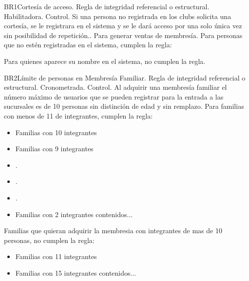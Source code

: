 \begin{BussinesRule}{BR1}{Cortesía de acceso.}
	\BRitem[Tipo:] Regla de integridad referencial o estructural. 
	\BRitem[Clase:] Habilitadora. 
	\BRitem[Nivel:] Control. %
	\BRitem[Descripción:]	Si una persona no registrada en los clubs solicita una cortesía, se le registrara en el sistema y se le dará acceso por una solo única vez sin posibilidad de repetición..
	\BRitem[Motivación:] Para generar ventas de membresía.
	 Para personas que no estén registradas en el sistema, cumplen la regla: 		
        	
	 Para quienes aparece su nombre en el sistema, no cumplen la regla.
	
\end{BussinesRule}

\begin{BussinesRule}{BR2}{Límite de personas en Membresía Familiar.} 
	\BRitem[Tipo:] Regla de integridad referencial o estructural. 
	\BRitem[Clase:] Cronometrada. 
	\BRitem[Nivel:] Control. %
	\BRitem[Descripción:] Al adquirir una membresía familiar el número máximo de usuarios que se pueden registrar para la entrada a las sucursales es de 10 personas sin distinción de edad y sin remplazo.
	 Para familias con menos de 11 de integrantes, cumplen la regla:
		\begin{itemize}
			\item Familias con 10 integrantes
			\item Familias con 9 integrantes
			\item .
			\item .
			\item .
			\item Familias con 2 integrantes
			contenidos...
		\end{itemize}
	
	 Familias que quieran adquirir la membresia con integrantes de mas de 10 personas, no cumplen la regla:
		\begin{itemize}
			\item Familias con 11 integrantes
			\item Familias con 15 integrantes
			contenidos...
		\end{itemize}
	
\end{BussinesRule}

